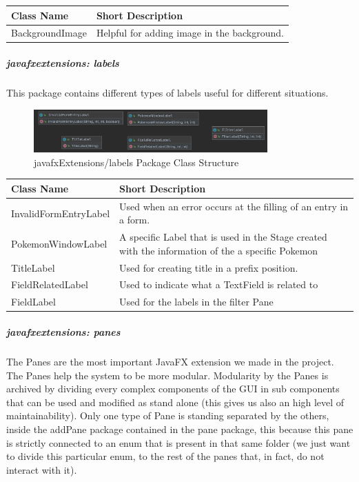 \begin{center}
	\begin{tabular}{| m{14em} | m{19em} |} 
		\hline
		\textbf{Class Name} & \textbf{Short Description} \\ [0.5ex] 
		\hline
		BackgroundImage & Helpful for adding image in the background.\\ 
		\hline
	\end{tabular}
\end{center}

\subparagraph{javafxextensions: labels}
This package contains different types of labels useful for different situations.
\begin{figure}[H]
	\centering
	\includegraphics[width=0.8\textwidth]{img/javafx_labels_package.png}
	\caption{javafxExtensions/labels Package Class Structure}
\end{figure}
\begin{center}
	\begin{tabular}{| m{14em} | m{19em} |} 
		\hline
		\textbf{Class Name} & \textbf{Short Description} \\ [0.5ex] 
		\hline
		InvalidFormEntryLabel & Used when an error occurs at the filling of an entry in a form.\\ 
		\hline
		PokemonWindowLabel & A specific Label that is used in the Stage created with the information of the a specific Pokemon\\ 
		\hline
		TitleLabel & Used for creating title in a prefix position.\\ 
		\hline
		FieldRelatedLabel & Used to indicate what a TextField is related to\\ 
		\hline
		FieldLabel & Used for the labels in the filter Pane\\ 
		\hline
	\end{tabular}
\end{center}
\subparagraph{javafxextensions: panes}
The Panes are the most important JavaFX extension we made in the project. The Panes help the system to be more modular. Modularity by the Panes is archived by dividing every complex components of the GUI in sub components that can be used and modified as stand alone (this gives us also an high level of maintainability). Only one type of Pane is standing separated by the others, inside the addPane package contained in the pane package, this because this pane is strictly connected to an enum that is present in that same folder (we just want to divide this particular enum, to the rest of the panes that, in fact, do not interact with it). 
